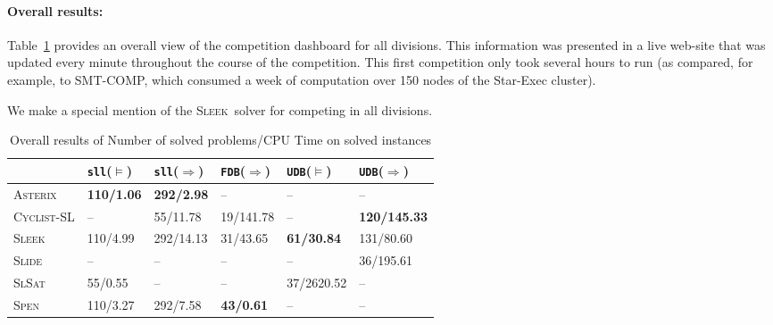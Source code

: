 \documentclass[twoside,11pt]{article}
\newcommand{\limp}{\Rightarrow}
\newcommand{\sllsat}{\texttt{sll}($\models$)}
\newcommand{\sllent}{\texttt{sll}($\limp$)}
\newcommand{\FDBent}{\texttt{FDB}($\limp$)}
\newcommand{\UDBsat}{\texttt{UDB}($\models$)}
\newcommand{\UDBent}{\texttt{UDB}($\limp$)}
\newcommand{\ASTERIX}{\textsc{Asterix}}
\newcommand{\CYCLIST}{\textsc{Cyclist-SL}}
\newcommand{\SLEEK}{\textsc{Sleek}}
\newcommand{\SLIDE}{\textsc{Slide}}
\newcommand{\SLSAT}{\textsc{SlSat}}
\newcommand{\SPEN}{\textsc{Spen}}
\begin{document}
\paragraph{Overall results:}
Table~\ref{tab:overall} provides an overall view of the competition dashboard for all divisions. This information was presented in a live web-site that was updated every minute throughout the course of the competition. This first competition only took several hours to run (as compared, for example, to SMT-COMP, which consumed a week of computation over 150 nodes of the Star-Exec cluster).
 
We make a special mention of the \SLEEK\ solver for competing in all divisions.


\begin{table}
\begin{center}
\begin{tabular}{p{2cm}p{2cm}p{2cm}p{2cm}p{2cm}p{2cm}}\hline
& \sllsat & \sllent & \FDBent
& \UDBsat & \UDBent \\\hline
\ASTERIX &
\textbf{110/1.06} &  %
\textbf{292/2.98} &  %
-- &
-- &
--
\\\hline
\CYCLIST &
-- &
55/11.78 & %
19/141.78 & %
-- &
\textbf{120/145.33} %
\\\hline
\SLEEK &
110/4.99 & %
292/14.13 & %
31/43.65 & %
\textbf{61/30.84} & %
131/80.60 %
\\\hline
\SLIDE &
-- &
-- &
-- &
-- &
36/195.61 %
\\\hline
\SLSAT &
55/0.55 & %
--  &
--  &
37/2620.52 & %
--
\\\hline
\SPEN &
110/3.27 & %
292/7.58 & %
\textbf{43/0.61} & %
-- &
--
\\\hline
\end{tabular}
\end{center}
\caption{Overall results of Number of solved problems/CPU Time on solved instances %
}
\label{tab:overall}
\end{table}
\end{document}
